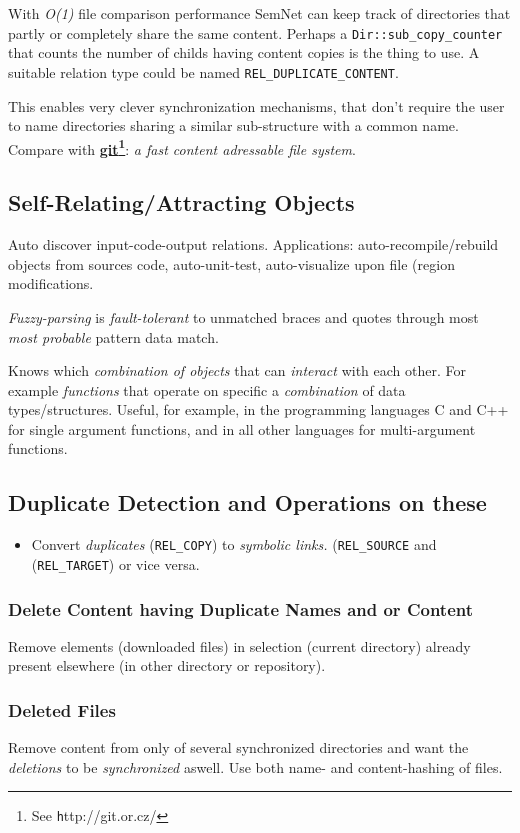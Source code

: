 \documentclass[a4paper,10pt,twocolumn]{article}
\newcommand{\codeCxx}[1]{\lstset{language=C++}\lstinline!#1!}
\newcommand{\codeREL}[1]{\lstset{language=C++}\lstinline!REL_#1!}
\newcommand{\hrefn}[2]{\href{#1}{#2}\footnote{See {\texttt #1}}} %
\newcommand{\sn}[0]{SemNet}
\begin{document}
With \emph{O(1)} file comparison performance \sn{} can keep track of
directories that partly or completely share the same content.  Perhaps a
\codeCxx{Dir::sub_copy_counter} that counts the number of childs having content copies
is the thing to use.  A suitable relation type could be named
\codeREL{DUPLICATE_CONTENT}.

This enables very clever synchronization mechanisms, that don't require the user
to name directories sharing a similar sub-structure with a common name.  Compare
with \textbf{\hrefn{http://git.or.cz/}{git}}: \emph{a fast content adressable
  file system}.

\subsection{Self-Relating/Attracting Objects}
Auto discover input-code-output relations. Applications: auto-recompile/rebuild
objects from sources code, auto-unit-test, auto-visualize upon file (region
modifications.

\emph{Fuzzy-parsing} is \emph{fault-tolerant} to unmatched braces and
quotes through most \emph{most probable} pattern data match.

Knows which \emph{combination of objects} that can \emph{interact} with each
other. For example \emph{functions} that operate on specific a
\emph{combination} of data types/structures. Useful, for example, in the
programming languages C and C++ for single argument functions, and in all other
languages for multi-argument functions.

\subsection{Duplicate Detection and Operations on these}
\begin{itemize}
\item Convert \emph{duplicates} (\codeREL{COPY}) to \emph{symbolic links.}
  (\codeREL{SOURCE} and (\codeREL{TARGET}) or vice versa.
\end{itemize}

\subsubsection{Delete Content having Duplicate Names and or Content}
Remove elements (downloaded files) in selection (current directory) already
present elsewhere (in other directory or repository).

\subsubsection{Deleted Files}
Remove content from only of several synchronized directories and want the
\emph{deletions} to be \emph{synchronized} aswell.  Use both name- and
content-hashing of files.
\end{document}
